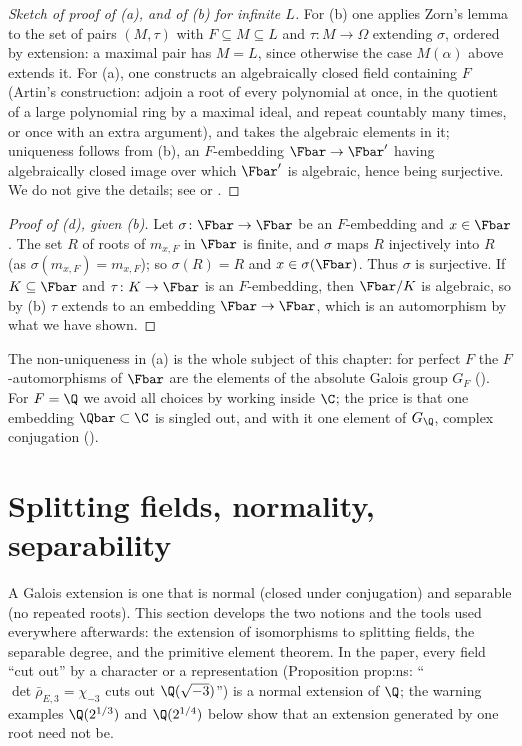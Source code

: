 \begin{proof}[Sketch of proof of (a), and of (b) for infinite $L$]
For (b) one applies Zorn's lemma to the set of pairs $(M,\tau)$ with $F\subseteq M\subseteq L$ and $\tau\colon M\to\Omega$
extending $\sigma$, ordered by extension: a maximal pair has $M=L$, since otherwise the case $M(\alpha)$ above extends it. For (a), one constructs an
algebraically closed field containing $F$ (Artin's construction: adjoin a root of every polynomial at once, in the quotient of a large polynomial ring by a
maximal ideal, and repeat countably many times, or once with an extra argument), and takes the algebraic elements in it; uniqueness follows from (b), an
$F$-embedding $\Fbar\to\Fbar'$ having algebraically closed image over which $\Fbar'$ is algebraic, hence being surjective. We do not give the details; see
\cite[Chapter V, Section 2]{Lang} or \cite[Section 13.4]{DummitFoote}.
\end{proof}

\begin{proof}[Proof of (d), given (b)]
Let $\sigma\colon\Fbar\to\Fbar$ be an $F$-embedding and $x\in\Fbar$. The set $R$ of roots of $m_{x,F}$ in $\Fbar$ is finite, and $\sigma$ maps $R$ injectively into $R$
(as $\sigma(m_{x,F})=m_{x,F}$); so $\sigma(R)=R$ and $x\in\sigma(\Fbar)$. Thus $\sigma$ is surjective. If $K\subseteq\Fbar$ and $\tau\colon K\to\Fbar$ is an $F$-embedding, then
$\Fbar/K$ is algebraic, so by (b) $\tau$ extends to an embedding $\Fbar\to\Fbar$, which is an automorphism by what we have shown.
\end{proof}

\begin{remark}\label{rem:galois:nonunique}
The non-uniqueness in (a) is the whole subject of this chapter: for perfect $F$ the $F$-automorphisms of $\Fbar$ are the elements of the absolute Galois
group $G_F$ (). For
$F=\Q$ we avoid all choices by working inside $\C$; the price is that one embedding $\Qbar\subset\C$ is singled out, and with it one element of $G_\Q$,
complex conjugation ().
\end{remark}

\section{Splitting fields, normality, separability}\label{sec:galois:splitting}

A Galois extension is one that is normal (closed under conjugation) and separable (no repeated roots). This section develops the two notions and the
tools used everywhere afterwards: the extension of isomorphisms to splitting fields, the separable degree, and the primitive element theorem. In the
paper, every field ``cut out'' by a character or a representation (Proposition prop:ns: ``$\det\bar\rho_{E,3}=\chi_{-3}$ cuts out $\Q(\sqrt{-3})$'') is a
normal extension of $\Q$; the warning examples $\Q(2^{1/3})$ and $\Q(2^{1/4})$ below show that an extension generated by one root need not be.

